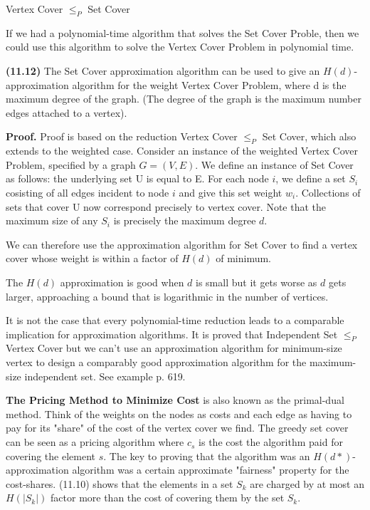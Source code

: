 \documentclass{proc}
\begin{document}
\begin{mdframed}
    Vertex Cover $\le_{P}$ Set Cover
\end{mdframed}

If we had a polynomial-time algorithm that solves the Set Cover Proble, then we could use this algorithm to solve the Vertex Cover Problem in polynomial time.

\begin{mdframed}
    \textbf{(11.12)} The Set Cover approximation algorithm can be used to give an $H(d)$-approximation algorithm for the weight Vertex Cover Problem, where d is the maximum degree of the graph. (The degree of the graph is the maximum number edges attached to a vertex).
    
    \textbf{Proof.} Proof is based on the reduction Vertex Cover $\leq_P $ Set Cover, which also extends to the weighted case. Consider an instance of the weighted Vertex Cover Problem, specified by a graph $G = (V,E)$. We define an instance of Set Cover as follows: the underlying set U is equal to E. For each node $i$, we define a set $S_i$ cosisting of all edges incident to node $i$ and give this set weight $w_i$. Collections of sets that cover U now correspond precisely to vertex cover. Note that the maximum size of any $S_i$ is precisely the maximum degree $d$.
    
    We can therefore use the approximation algorithm for Set Cover to find a vertex cover whose weight is within a factor of $H(d)$ of minimum.
\end{mdframed}

The $H(d)$ approximation is good when $d$ is small but it gets worse as $d$ gets larger, approaching a bound that is logarithmic in the number of vertices.

\begin{mdframed}
    It is not the case that every polynomial-time reduction leads to a comparable implication for approximation algorithms. It is proved that Independent Set $\leq_P$ Vertex Cover but we can't use an approximation algorithm for minimum-size vertex to design a comparably good approximation algorithm for the maximum-size independent set. See example p. 619.
\end{mdframed}

\textbf{The Pricing Method to Minimize Cost} is also known as the primal-dual method. Think of the weights on the nodes as costs and each edge as having to pay for its "share" of the cost of the vertex cover we find. The greedy set cover can be seen as a pricing algorithm where $c_s$ is the cost the algorithm paid for covering the element $s$. The key to proving that the algorithm was an $H(d*)$-approximation algorithm was a certain approximate "fairness" property for the cost-shares. (11.10) shows that the elements in a set $S_k$ are charged by at most an $H(|S_k|)$ factor more than the cost of covering them by the set $S_k$.
\end{document}

